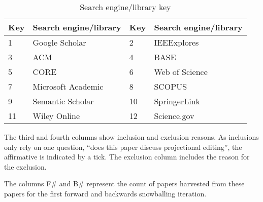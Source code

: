 \begin{table}[h]
    \begin{center}
        \begin{tabular}{ | l | l | l | l |} 
            \hline
            Key & Search engine/library    & Key & Search engine/library     \\
            \hline
            \hline
            1  & Google Scholar            & 2  & IEEExplores                \\
            3  & ACM                       & 4  & BASE                       \\
            5  & CORE                      & 6  & Web of Science             \\
            7  & Microsoft Academic        & 8  & SCOPUS                     \\
            9  & Semantic Scholar          & 10 & SpringerLink               \\
            11 & Wiley Online              & 12 & Science.gov                \\
            \hline
        \end{tabular}
    \end{center}
    \caption{Search engine/library key}
    \label{table:SearchEngineKey}
\end{table}

The third and fourth columns show inclusion and exclusion reasons.
As inclusions only rely on one question, ``does this paper discuss projectional editing'', the affirmative is indicated by a tick.
The exclusion column includes the reason for the exclusion.

The columns F\# and B\# represent the count of papers harvested from these papers for the first forward and backwards snowballing iteration.

